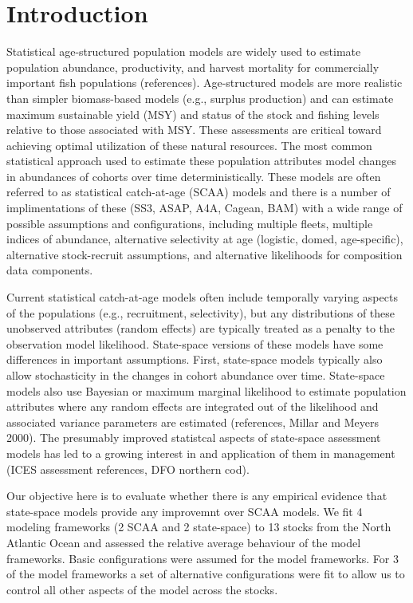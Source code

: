 \documentclass[12pt,letterpaper, leqno]{article}
\begin{document}
\pagebreak

\section*{Introduction}

Statistical age-structured population models are widely used to estimate population abundance, productivity, and harvest mortality for commercially important fish populations (references). Age-structured models are more realistic than simpler biomass-based models (e.g., surplus production) and can estimate maximum sustainable yield (MSY) and status of the stock and fishing levels relative to those associated with MSY. These assessments are critical toward achieving optimal utilization of these natural resources. The most common statistical approach used to estimate these population attributes model changes in abundances of cohorts over time deterministically. These models are often referred to as statistical catch-at-age (SCAA) models and there is a number of implimentations of these (SS3, ASAP, A4A, Cagean, BAM) with a wide range of possible assumptions and configurations, including multiple fleets, multiple indices of abundance, alternative selectivity at age (logistic, domed, age-specific), alternative stock-recruit assumptions, and alternative likelihoods for composition data components. 

Current statistical catch-at-age models often include temporally varying aspects of the populations (e.g., recruitment, selectivity), but any distributions of these unobserved attributes (random effects) are typically treated as a penalty to the observation model likelihood. State-space versions of these models have some differences in important assumptions. First, state-space models typically also allow stochasticity in the changes in cohort abundance over time. State-space models also use Bayesian or maximum marginal likelihood to estimate population attributes where any random effects are integrated out of the likelihood and associated variance parameters are estimated (references, Millar and Meyers 2000). The presumably improved statistcal aspects of state-space assessment models has led to a growing interest in and application of them in management (ICES assessment references, DFO northern cod).

Our objective here is to evaluate whether there is any empirical evidence that state-space models provide any improvemnt over SCAA models. We fit 4 modeling frameworks (2 SCAA and 2 state-space) to 13 stocks from the North Atlantic Ocean and assessed the relative average behaviour of the model frameworks. Basic configurations were assumed for the model frameworks. For 3 of the model frameworks a set of alternative configurations were fit to allow us to control all other aspects of the model across the stocks.
\end{document}
